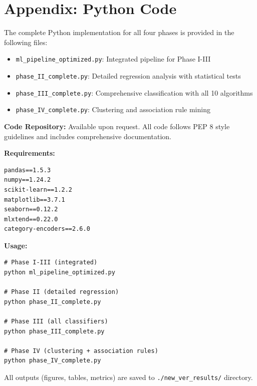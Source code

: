 \documentclass[12pt,man]{apa7}
\begin{document}
\section{Appendix: Python Code}

The complete Python implementation for all four phases is provided in the following files:

\begin{itemize}
    \item \texttt{ml\_pipeline\_optimized.py}: Integrated pipeline for Phase I-III
    \item \texttt{phase\_II\_complete.py}: Detailed regression analysis with statistical tests
    \item \texttt{phase\_III\_complete.py}: Comprehensive classification with all 10 algorithms
    \item \texttt{phase\_IV\_complete.py}: Clustering and association rule mining
\end{itemize}

\textbf{Code Repository:} Available upon request. All code follows PEP 8 style guidelines and includes comprehensive documentation.

\textbf{Requirements:}
\begin{verbatim}
pandas==1.5.3
numpy==1.24.2
scikit-learn==1.2.2
matplotlib==3.7.1
seaborn==0.12.2
mlxtend==0.22.0
category-encoders==2.6.0
\end{verbatim}

\textbf{Usage:}
\begin{verbatim}
# Phase I-III (integrated)
python ml_pipeline_optimized.py

# Phase II (detailed regression)
python phase_II_complete.py

# Phase III (all classifiers)
python phase_III_complete.py

# Phase IV (clustering + association rules)
python phase_IV_complete.py
\end{verbatim}

All outputs (figures, tables, metrics) are saved to \texttt{./new\_ver\_results/} directory.
\end{document}
